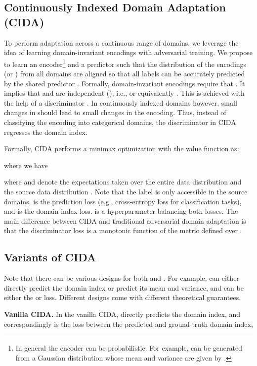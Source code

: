 \documentclass{article}
\begin{document}
\subsection{Continuously Indexed Domain Adaptation (CIDA)}\label{sec:cida}
To perform adaptation across a continuous range of domains, we leverage the idea of learning domain-invariant encodings with adversarial training. We propose to learn an encoder\footnote{In general the encoder  can be probabilistic. For example,  can be generated from a Gaussian distribution whose mean and variance are given by .}  and a predictor  such that the distribution of the encodings  (or ) from all domains  are aligned so that all labels can be accurately predicted by the shared predictor . 
Formally, domain-invariant encodings require that . It implies that  and  are independent (), i.e.,  or equivalently . This is achieved with the help of a discriminator . In continuously indexed domains however, small changes in  should lead to small changes in the encoding. Thus, instead of classifying the encoding into categorical domains, the discriminator  in CIDA regresses the domain index. 

Formally, CIDA performs a minimax optimization with the value function  as:

where we have

where  and  denote the expectations taken over the entire data distribution  and the source data distribution . Note that the label  is only accessible in the source domains.  is the prediction loss (e.g., cross-entropy loss for classification tasks), and  is the domain index loss.  is a hyperparameter balancing both losses. The main difference between CIDA and traditional adversarial domain adaptation is that the discriminator loss  is a monotonic function of the metric defined over . 








\subsection{Variants of CIDA}\label{sec:pcida}
Note that there can be various designs for both  and . For example,  can either directly predict the domain index or predict its mean and variance, and  can be either the  or  loss. Different designs come with different theoretical guarantees. 

\textbf{Vanilla CIDA.} In the vanilla CIDA,  directly predicts the domain index, and correspondingly  is the  loss between the predicted and ground-truth domain index,
\end{document}
